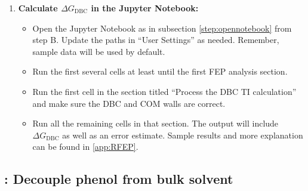 \documentclass[9pt,tutorial]{Styling/livecoms}
\begin{document}
\begin{enumerate}
\begin{enumerate}[label=\alph*., ref=\theenumi.\alph*]
\begin{itemize}
            \end{itemize}
            \item \textbf{Calculate $\Delta G_\mathrm{DBC}$ in the Jupyter Notebook:}
            \begin{itemize}
                \item Open the Jupyter Notebook as in subsection \ref{step:opennotebook} from step B. Update the paths in ``User Settings'' as needed. Remember, sample data will be used by default.
                \item Run the first several cells at least until the first FEP analysis section. 
                \item Run the first cell in the section titled ``Process the DBC TI calculation'' and make sure the DBC and COM walls are correct.
                \item Run all the remaining cells in that section. The output will include $\Delta G_\mathrm{DBC}$ as well as an error estimate. Sample results and more explanation can be found in \ref{app:RFEP}.
            \end{itemize}
        \end{enumerate}
    \end{enumerate}
    
\subsection{\hspace{-1em}: Decouple phenol from bulk solvent}
\end{document}
